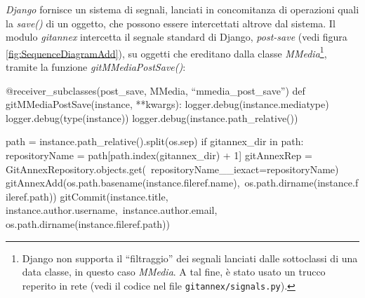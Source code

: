 \emph{Django} fornisce un sistema di segnali, lanciati in concomitanza di
operazioni quali la \emph{save()} di un oggetto, che possono essere
intercettati altrove dal sistema. Il modulo \emph{gitannex} intercetta
il segnale standard di Django, \emph{post-save} (vedi figura
\ref{fig:SequenceDiagramAdd}), su oggetti che ereditano dalla classe
\emph{MMedia}\footnote{Django non supporta il ``filtraggio'' dei
  segnali lanciati dalle sottoclassi di una data classe, in questo
  caso \emph{MMedia}. A tal fine, è stato usato un trucco reperito in
  rete (vedi il codice nel file \texttt{gitannex/signals.py}).},
tramite la funzione \emph{gitMMediaPostSave()}:

\begin{code}
@receiver_subclasses(post_save, MMedia, ``mmedia_post_save'')
def gitMMediaPostSave(instance, **kwargs):
    logger.debug(instance.mediatype)
    logger.debug(type(instance))
    logger.debug(instance.path_relative())

    path = instance.path_relative().split(os.sep)
    if gitannex_dir in path:
        repositoryName = path[path.index(gitannex_dir) + 1]
        gitAnnexRep = GitAnnexRepository.objects.get(\
                      repositoryName__iexact=repositoryName)
        gitAnnexAdd(os.path.basename(instance.fileref.name),\
                    os.path.dirname(instance.fileref.path))
        gitCommit(instance.title, instance.author.username,\
                  instance.author.email, os.path.dirname(instance.fileref.path))
\end{code}







